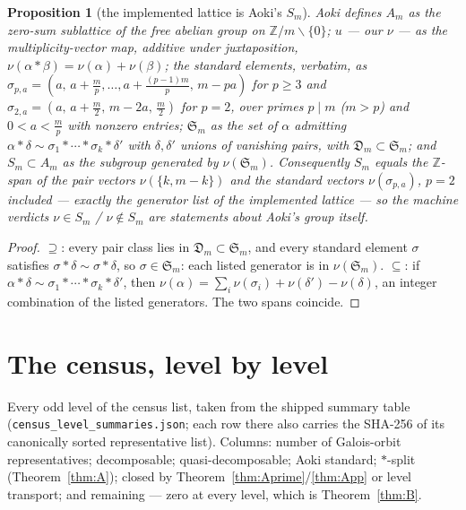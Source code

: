 \documentclass[11pt]{amsart}
\newtheorem{proposition}[theorem]{Proposition}
\theoremstyle{remark}
\newcommand{\Z}{\mathbb{Z}}
\begin{document}
\begin{proposition}[the implemented lattice is Aoki's $S_m$]\label{prop:ident}
Aoki \cite[\S2]{Aoki00} defines $A_m$ as the zero-sum sublattice of the free abelian group on
$\Z/m\smallsetminus\{0\}$; $u$ --- our $\nu$ --- as the multiplicity-vector map, additive
under juxtaposition, $\nu(\alpha*\beta)=\nu(\alpha)+\nu(\beta)$; the standard elements,
verbatim, as
$\sigma_{p,a}=(a,\,a+\frac mp,\dots,a+\frac{(p-1)m}p,\,m-pa)$ for $p\ge3$ and
$\sigma_{2,a}=(a,\,a+\frac m2,\,m-2a,\,\frac m2)$ for $p=2$, over primes $p\mid m$ ($m>p$) and
$0<a<\frac mp$ with nonzero entries; $\mathfrak S_m$ as the set of $\alpha$ admitting
$\alpha*\delta\sim\sigma_1*\cdots*\sigma_k*\delta'$ with $\delta,\delta'$ unions of vanishing
pairs, with $\mathfrak D_m\subset\mathfrak S_m$; and $S_m\subset A_m$ as the subgroup generated
by $\nu(\mathfrak S_m)$. Consequently $S_m$ equals the $\Z$-span of the pair vectors
$\nu(\{k,m-k\})$ and the standard vectors $\nu(\sigma_{p,a})$, $p=2$ included --- exactly the
generator list of the implemented lattice --- so the machine verdicts $\nu\in S_m$ /
$\nu\notin S_m$ are statements about Aoki's group itself.
\end{proposition}
\begin{proof}
$\supseteq$: every pair class lies in $\mathfrak D_m\subset\mathfrak S_m$, and every standard
element $\sigma$ satisfies $\sigma*\delta\sim\sigma*\delta$, so $\sigma\in\mathfrak S_m$: each
listed generator is in $\nu(\mathfrak S_m)$. $\subseteq$: if
$\alpha*\delta\sim\sigma_1*\cdots*\sigma_k*\delta'$, then
$\nu(\alpha)=\sum_i\nu(\sigma_i)+\nu(\delta')-\nu(\delta)$, an integer combination of the listed
generators. The two spans coincide.
\end{proof}

\section{The census, level by level}\label{app:census}

\label{tab:census}

Every odd level of the census list, taken from the shipped summary table
(\texttt{census\_level\_\allowbreak summaries.json}; each row there also carries the SHA-256 of
its canonically sorted representative list). Columns: number of Galois-orbit representatives; decomposable;
quasi-decomposable; Aoki standard; $*$-split (Theorem~\ref{thm:A}); closed by
Theorem~\ref{thm:Aprime}/\ref{thm:App} or level transport; and remaining --- zero at every
level, which is Theorem~\ref{thm:B}.
\end{document}
